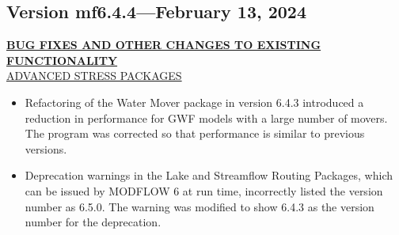 	
	\subsection{Version mf6.4.4---February 13, 2024}
	


	\textbf{\underline{BUG FIXES AND OTHER CHANGES TO EXISTING FUNCTIONALITY}} \\



	\underline{ADVANCED STRESS PACKAGES}
	\begin{itemize}
		\item Refactoring of the Water Mover package in version 6.4.3 introduced a reduction in performance for GWF models with a large number of movers.  The program was corrected so that performance is similar to previous versions.
		\item Deprecation warnings in the Lake and Streamflow Routing Packages, which can be issued by MODFLOW 6 at run time, incorrectly listed the version number as 6.5.0.  The warning was modified to show 6.4.3 as the version number for the deprecation.
	\end{itemize}

